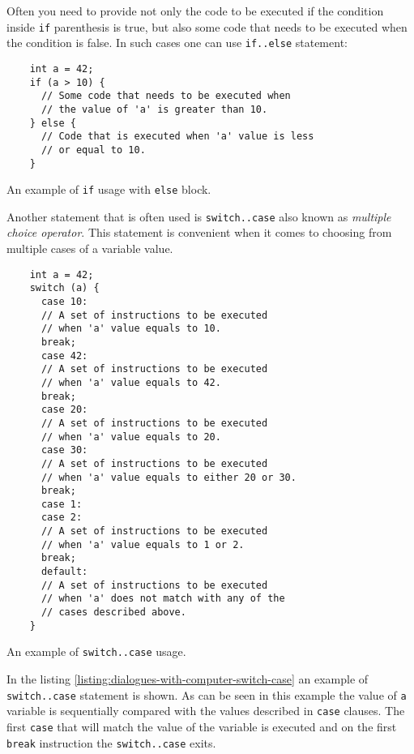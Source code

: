\documentclass[../sparc.tex]{subfiles}
\begin{document}
Often you need to provide not only the code to be executed if the condition
inside \texttt{if} parenthesis is true, but also some code that needs to be
executed when the condition is false.  In such cases one can use
\texttt{if..else} statement:

\begin{listing}[ht]
  \begin{verbatim}
    int a = 42;
    if (a > 10) {
      // Some code that needs to be executed when
      // the value of 'a' is greater than 10.
    } else {
      // Code that is executed when 'a' value is less
      // or equal to 10.
    }
  \end{verbatim}
  \label{listing:dialogues-with-computer-if-with-else}
  \caption{An example of \texttt{if} usage with \texttt{else} block.}
\end{listing}

Another statement that is often used is \texttt{switch..case} also known as
\emph{multiple choice operator}.  This statement is convenient when it comes to
choosing from multiple cases of a variable value.

\begin{listing}[ht]
  \begin{verbatim}
    int a = 42;
    switch (a) {
      case 10:
      // A set of instructions to be executed
      // when 'a' value equals to 10.
      break;
      case 42:
      // A set of instructions to be executed
      // when 'a' value equals to 42.
      break;
      case 20:
      // A set of instructions to be executed
      // when 'a' value equals to 20.
      case 30:
      // A set of instructions to be executed
      // when 'a' value equals to either 20 or 30.
      break;
      case 1:
      case 2:
      // A set of instructions to be executed
      // when 'a' value equals to 1 or 2.
      break;
      default:
      // A set of instructions to be executed
      // when 'a' does not match with any of the
      // cases described above.
    }
  \end{verbatim}
  \label{listing:dialogues-with-computer-switch-case}
  \caption{An example of \texttt{switch..case} usage.}
\end{listing}

In the listing \ref{listing:dialogues-with-computer-switch-case} an example of
\texttt{switch..case} statement is shown. As can be seen in this example the
value of \texttt{a} variable is sequentially compared with the values described
in \texttt{case} clauses.  The first \texttt{case} that will match the value of
the variable is executed and on the first \texttt{break} instruction the
\texttt{switch..case} exits.
\end{document}
